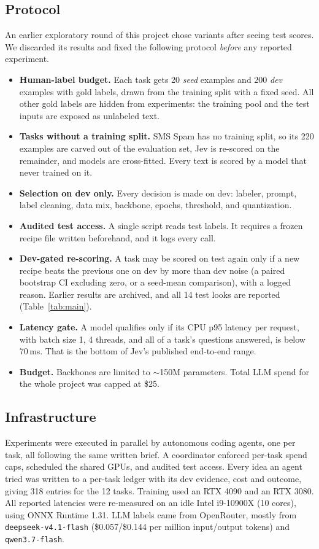 \documentclass[11pt]{article}
\begin{document}
\subsection{Protocol}\label{sec:protocol}
An earlier exploratory round of this project chose variants after seeing test scores.
We discarded its results and fixed the following protocol \emph{before} any reported experiment.
\begin{itemize}
  \item \textbf{Human-label budget.} Each task gets 20 \emph{seed} examples and 200 \emph{dev} examples with gold labels, drawn from the training split with a fixed seed. All other gold labels are hidden from experiments: the training pool and the test inputs are exposed as unlabeled text.
  \item \textbf{Tasks without a training split.} SMS Spam has no training split, so its 220 examples are carved out of the evaluation set, Jev is re-scored on the remainder, and models are cross-fitted. Every text is scored by a model that never trained on it.
  \item \textbf{Selection on dev only.} Every decision is made on dev: labeler, prompt, label cleaning, data mix, backbone, epochs, threshold, and quantization.
  \item \textbf{Audited test access.} A single script reads test labels. It requires a frozen recipe file written beforehand, and it logs every call.
  \item \textbf{Dev-gated re-scoring.} A task may be scored on test again only if a new recipe beats the previous one on dev by more than dev noise (a paired bootstrap CI excluding zero, or a seed-mean comparison), with a logged reason. Earlier results are archived, and all 14 test looks are reported (Table~\ref{tab:main}).
  \item \textbf{Latency gate.} A model qualifies only if its CPU p95 latency per request, with batch size 1, 4 threads, and all of a task's questions answered, is below 70\,ms. That is the bottom of Jev's published end-to-end range.
  \item \textbf{Budget.} Backbones are limited to $\sim$150M parameters. Total LLM spend for the whole project was capped at \$25.
\end{itemize}

\subsection{Infrastructure}
Experiments were executed in parallel by autonomous coding agents, one per task, all following the same written brief.
A coordinator enforced per-task spend caps, scheduled the shared GPUs, and audited test access.
Every idea an agent tried was written to a per-task ledger with its dev evidence, cost and outcome, giving 318 entries for the 12 tasks.
Training used an RTX 4090 and an RTX 3080.
All reported latencies were re-measured on an idle Intel i9-10900X (10 cores), using ONNX Runtime 1.31.
LLM labels came from OpenRouter, mostly from \texttt{deepseek-v4.1-flash} (\$0.057/\$0.144 per million input/output tokens) and \texttt{qwen3.7-flash}.
\end{document}
